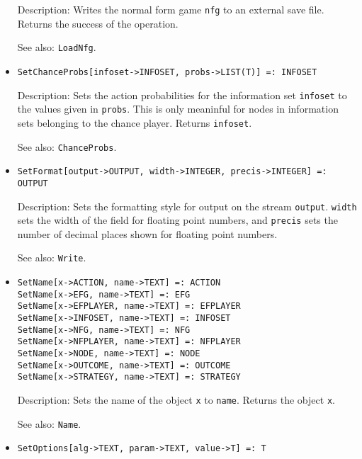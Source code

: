 \begin{itemize}
\bd
\item
[Description:] Writes the normal form game \verb+nfg+ to an external
save file.  Returns the success of the operation.
\item
[See also:] {\tt LoadNfg}.
\ed

\item
\protect \large \begin{verbatim} 
SetChanceProbs[infoset->INFOSET, probs->LIST(T)] =: INFOSET
\end{verbatim}\normalsize

\bd
\item
[Description:] Sets the action probabilities for the information set
\verb+infoset+ to the values given in \verb+probs+.  This is only
meaninful for nodes in information sets belonging to the chance
player.  Returns \verb+infoset+. 
\item
[See also:] {\tt ChanceProbs}.
\ed

\item
\protect \large \begin{verbatim}
SetFormat[output->OUTPUT, width->INTEGER, precis->INTEGER] =: OUTPUT
\end{verbatim}\normalsize

\bd
\item
[Description:] Sets the formatting style for output on the stream
\verb+output+.  \verb+width+ sets the width of the field for floating
point numbers, and \verb+precis+ sets the number of decimal places shown
for floating point numbers.
\item
[See also:] {\tt Write}.
\ed

\item
\protect \large \begin{verbatim}
SetName[x->ACTION, name->TEXT] =: ACTION
SetName[x->EFG, name->TEXT] =: EFG
SetName[x->EFPLAYER, name->TEXT] =: EFPLAYER
SetName[x->INFOSET, name->TEXT] =: INFOSET
SetName[x->NFG, name->TEXT] =: NFG
SetName[x->NFPLAYER, name->TEXT] =: NFPLAYER
SetName[x->NODE, name->TEXT] =: NODE
SetName[x->OUTCOME, name->TEXT] =: OUTCOME
SetName[x->STRATEGY, name->TEXT] =: STRATEGY
\end{verbatim}\normalsize

\bd
\item
[Description:] Sets the name of the object \verb+x+ to \verb+name+.
Returns the object \verb+x+.
\item
[See also:] {\tt Name}.
\ed

\item
\protect \large \begin{verbatim}
SetOptions[alg->TEXT, param->TEXT, value->T] =: T
\end{verbatim}\normalsize


\end{itemize}
